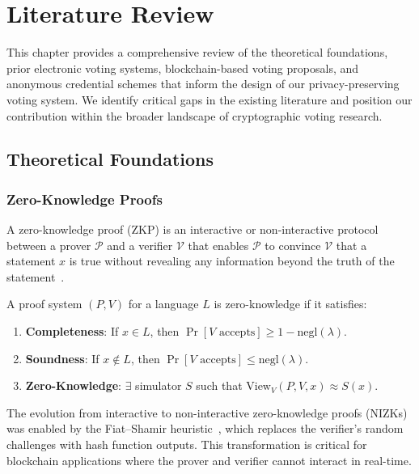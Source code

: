 \chapter{Literature Review}\label{ch:literature}

This chapter provides a comprehensive review of the theoretical foundations, prior electronic voting systems, blockchain-based voting proposals, and anonymous credential schemes that inform the design of our privacy-preserving voting system. We identify critical gaps in the existing literature and position our contribution within the broader landscape of cryptographic voting research.

\section{Theoretical Foundations}

\subsection{Zero-Knowledge Proofs}

A zero-knowledge proof (ZKP) is an interactive or non-interactive protocol between a prover $\mathcal{P}$ and a verifier $\mathcal{V}$ that enables $\mathcal{P}$ to convince $\mathcal{V}$ that a statement $x$ is true without revealing any information beyond the truth of the statement~\cite{goldwasser1989knowledge}.

\begin{definition}
A proof system $(P, V)$ for a language $L$ is zero-knowledge if it satisfies:
\begin{enumerate}
    \item \textbf{Completeness}: If $x \in L$, then $\Pr[V \text{ accepts}] \geq 1 - \text{negl}(\lambda)$.
    \item \textbf{Soundness}: If $x \notin L$, then $\Pr[V \text{ accepts}] \leq \text{negl}(\lambda)$.
    \item \textbf{Zero-Knowledge}: $\exists$ simulator $S$ such that $\text{View}_V(P, V, x) \approx S(x)$.
\end{enumerate}
\end{definition}

The evolution from interactive to non-interactive zero-knowledge proofs (NIZKs) was enabled by the Fiat--Shamir heuristic~\cite{fiat1986prove}, which replaces the verifier's random challenges with hash function outputs. This transformation is critical for blockchain applications where the prover and verifier cannot interact in real-time.

